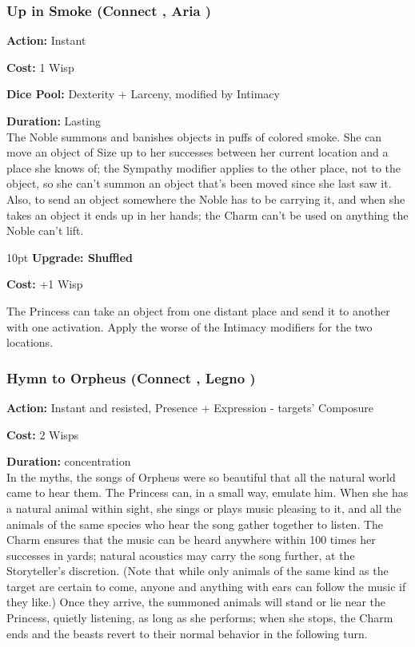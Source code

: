 \subsubsection*{Up in Smoke (Connect \textbullet\textbullet\textbullet, Aria \textbullet\textbullet\textbullet)}

\noindent \textbf{Action:} Instant

\noindent \textbf{Cost:} 1 Wisp

\noindent \textbf{Dice Pool:} Dexterity + Larceny, modified by Intimacy

\noindent \textbf{Duration:} Lasting \\

\noindent The Noble summons and banishes objects in puffs of colored smoke. She can move an object of Size up to her successes between her current location and a place she knows of; the Sympathy modifier applies to the other place, not to the object, so she can’t summon an object that’s been moved since she last saw it. Also, to send an object somewhere the Noble has to be carrying it, and when she takes an object it ends up in her hands; the Charm can’t be used on anything the Noble can’t lift.

\begin{myindentpar}{10pt} \textbf{Upgrade: Shuffled}

\noindent \textbf{Cost:} +1 Wisp

The Princess can take an object from one distant place and send it to another with one activation. Apply the worse of the Intimacy modifiers for the two locations.
\end{myindentpar} 

\subsubsection*{Hymn to Orpheus (Connect \textbullet\textbullet\textbullet, Legno \textbullet\textbullet)}

\noindent \textbf{Action:} Instant and resisted, Presence + Expression - targets' Composure

\noindent \textbf{Cost:} 2 Wisps

\noindent \textbf{Duration:} concentration \\

In the myths, the songs of Orpheus were so beautiful that all the natural world came to hear them. The Princess can, in a small way, emulate him. When she has a natural animal within sight, she sings or plays music pleasing to it, and all the animals of the same species who hear the song gather together to listen. The Charm ensures that the music can be heard anywhere within 100 times her successes in yards; natural acoustics may carry the song further, at the Storyteller's discretion. (Note that while only animals of the same kind as the target are certain to come, anyone and anything with ears can follow the music if they like.) Once they arrive, the summoned animals will stand or lie near the Princess, quietly listening, as long as she performs; when she stops, the Charm ends and the beasts revert to their normal behavior in the following turn.

